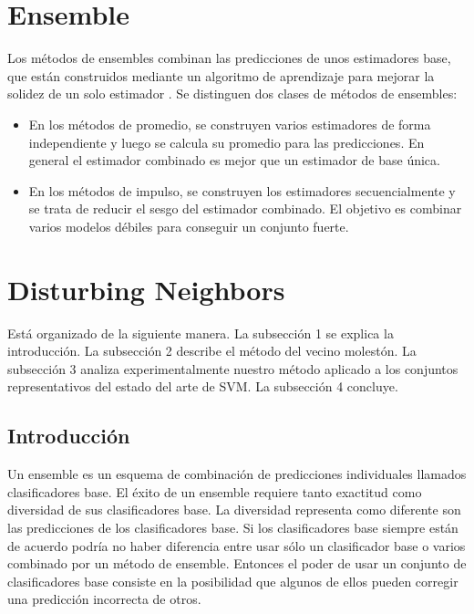 \section{Ensemble}
Los métodos de ensembles combinan las predicciones de unos estimadores base, que están construidos mediante un algoritmo de aprendizaje para mejorar la solidez de un solo estimador \cite{ensemble}.
Se distinguen dos clases de métodos de ensembles:
	\begin{itemize}
		\item En los métodos de promedio, se construyen varios estimadores de forma independiente y luego se calcula su promedio para las predicciones. En general el estimador combinado es mejor que un estimador de base única.
		\item En los métodos de impulso, se construyen los estimadores secuencialmente y se trata de reducir el sesgo del estimador combinado. El objetivo es combinar varios modelos débiles para conseguir un conjunto fuerte.
	\end{itemize}



\section{Disturbing Neighbors}
Está organizado de la siguiente manera. La subsección 1 se explica la introducción. La subsección 2 describe el método del vecino molestón. La subsección 3 analiza experimentalmente nuestro método aplicado a los conjuntos representativos del estado del arte de SVM. La subsección 4 concluye.
\subsection{Introducción}
Un ensemble es un esquema de combinación de predicciones individuales llamados clasificadores base. El éxito de un ensemble requiere tanto exactitud como diversidad de sus clasificadores base. La diversidad representa como diferente son las predicciones de los clasificadores base. Si los clasificadores base siempre están de acuerdo podría no haber diferencia entre usar sólo un clasificador base o varios combinado por un método de ensemble. Entonces el poder de usar un conjunto de clasificadores base consiste en la posibilidad que algunos de ellos pueden corregir una predicción incorrecta de otros.

